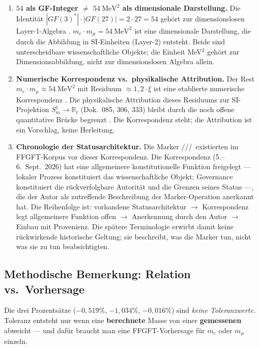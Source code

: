 \begin{enumerate}\itemsep4pt
\item \textbf{$54$ als GF-Integer $\neq$ $54~\text{MeV}^2$ als dimensionale Darstellung.}
  Die Identität $|GF(3)^*|\cdot|GF(27)|=2\cdot27=54$ gehört zur dimensionslosen Layer-1-Algebra \BM.
  $m_e\cdot m_\mu=54~\text{MeV}^2$ ist eine dimensionale Darstellung, die durch die Abbildung in
  SI-Einheiten (Layer-2) entsteht. Beide sind unterscheidbare wissenschaftliche Objekte;
  die Einheit MeV$^2$ gehört zur Dimensionsabbildung, nicht zur dimensionslosen Algebra allein.

\item \textbf{Numerische Korrespondenz vs.\ physikalische Attribution.}
  Der Rest $m_e\cdot m_\mu\approx54~\text{MeV}^2$ mit Residuum $\approx1{,}2\cdot\xi$
  ist eine etablierte numerische Korrespondenz \KM.
  Die physikalische Attribution dieses Residuums zur SI-Projektion
  $S^1_m\to\mathbb{R}_t$ (Dok.~085, 306, 333) bleibt durch die noch offene
  quantitative Brücke begrenzt \SM.
  Die Korrespondenz steht; die Attribution ist ein Vorschlag, keine Herleitung.

\item \textbf{Chronologie der Statusarchitektur.}
  Die Marker \BM/\KM/\SM/\QM\ existierten im FFGFT-Korpus vor dieser Korrespondenz.
  Die Korrespondenz (5.--6.~Sept.~2026) hat eine allgemeinere konstitutionelle Funktion
  freigelegt --- lokaler Prozess konstituiert das wissenschaftliche Objekt; Governance
  konstituiert die rückverfolgbare Autorität und die Grenzen seines Status ---, die der
  Autor als zutreffende Beschreibung der Marker-Operation anerkannt hat. Die Reihenfolge
  ist: vorhandene Statusarchitektur $\to$ Korrespondenz legt allgemeinere Funktion offen
  $\to$ Anerkennung durch den Autor $\to$ Einbau mit Provenienz. Die spätere Terminologie
  erwirbt damit keine rückwirkende historische Geltung; sie beschreibt, was die Marker
  tun, nicht was sie zu tun beabsichtigten.
\end{enumerate}


\subsection*{Methodische Bemerkung: Relation vs.\ Vorhersage}

Die drei Prozentsätze ($-0{,}519\%$, $-1{,}034\%$, $-0{,}016\%$) sind
\emph{keine Toleranzwerte}. Toleranz entsteht nur wenn eine
\textbf{berechnete} Masse von einer \textbf{gemessenen} abweicht ---
und dafür braucht man eine FFGFT-Vorhersage für $m_e$ oder $m_\mu$
einzeln.

